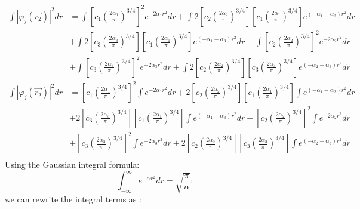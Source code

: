 \documentclass{article}
\begin{document}
\begin{align*} 
                             \int |\varphi_j(\vec{r_2})|^2dr                         &= \int \left[ c_1  \left( \frac{2\alpha_1}{\pi} \right)^{3/4} \right] ^2 e^{-2\alpha_1 r^2}dr + \int 2 \left[ c_2 \left( \frac{2\alpha_2}{\pi} \right)^{3/4} \right] \left[ c_1  \left( \frac{2\alpha_1}{\pi} \right)^{3/4} \right] e^{(-\alpha_1 - \alpha_2 )r^2}dr \\
                             &+ \int 2\left[ c_3 \left( \frac{2\alpha_3}{\pi} \right)^{3/4} \right] \left[ c_1  \left( \frac{2\alpha_1}{\pi} \right)^{3/4} \right] e^{(-\alpha_1  - \alpha_3 )r^2}dr + \int \left[ c_2  \left( \frac{2\alpha_2}{\pi} \right)^{3/4} \right] ^2 e^{-2\alpha_2 r^2}dr \\ 
                             &+ \int \left[ c_3  \left( \frac{2\alpha_3}{\pi} \right)^{3/4} \right] ^2 e^{-2\alpha_3 r^2}dr + \int 2 \left[ c_2 \left( \frac{2\alpha_2}{\pi} \right)^{3/4} \right] \left[ c_3  \left( \frac{2\alpha_3}{\pi} \right)^{3/4} \right] e^{(-\alpha_2 - \alpha_3 )r^2}dr \\
   \int |\varphi_j(\vec{r_2})|^2  dr                       &= \left[ c_1  \left( \frac{2\alpha_1}{\pi} \right)^{3/4} \right] ^2 \int e^{-2\alpha_1 r^2}dr + 2 \left[ c_2 \left( \frac{2\alpha_2}{\pi} \right)^{3/4} \right] \left[ c_1  \left( \frac{2\alpha_1}{\pi} \right)^{3/4} \right] \int e^{(-\alpha_1 - \alpha_2 )r^2}dr \\
                             &+ 2\left[ c_3 \left( \frac{2\alpha_3}{\pi} \right)^{3/4} \right] \left[ c_1  \left( \frac{2\alpha_1}{\pi} \right)^{3/4} \right] \int e^{(-\alpha_1  - \alpha_3 )r^2}dr + \left[ c_2  \left( \frac{2\alpha_2}{\pi} \right)^{3/4} \right] ^2 \int e^{-2\alpha_2 r^2}dr \\ 
                             &+ \left[ c_3  \left( \frac{2\alpha_3}{\pi} \right)^{3/4} \right] ^2 \int e^{-2\alpha_3 r^2}dr + 2 \left[ c_2 \left( \frac{2\alpha_2}{\pi} \right)^{3/4} \right] \left[ c_3  \left( \frac{2\alpha_3}{\pi} \right)^{3/4} \right] \int e^{(-\alpha_2 - \alpha_3 )r^2}dr \\
\end{align*}
   Using the Gaussian integral formula:  \[\int_{-\infty}^{\infty} e^{-\alpha r^2}dr = \sqrt{\frac{\pi}{\alpha}};\] we can rewrite the integral terms as : 
\end{document}

